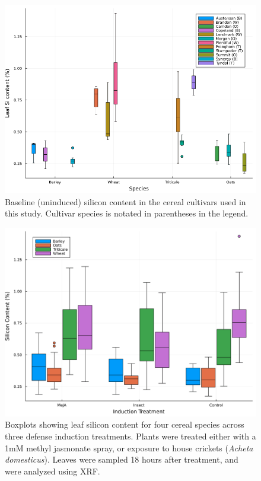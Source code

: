 \documentclass[12pt, letterpaper, ]{report}
\begin{document}
\begin{figure}[h]
        \includegraphics[width = \textwidth]{images/spp_si_content.png}
        \centering
        \caption{Baseline (uninduced) silicon content in the cereal cultivars used in this study. Cultivar species is notated in parentheses in the legend.}
        \label{Fig:baseline_si}
\end{figure}

\begin{figure}[h]
        \includegraphics[width = \textwidth]{images/induction_plot.png}
        \centering
        \caption{Boxplots showing leaf silicon content for four cereal species across three defense induction treatments. Plants were treated either with a 1mM methyl jasmonate spray, or exposure to house crickets (\textit{Acheta domesticus}). Leaves were sampled 18 hours after treatment, and were analyzed using XRF.}
        \label{Fig:induction}
\end{figure}
\end{document}
